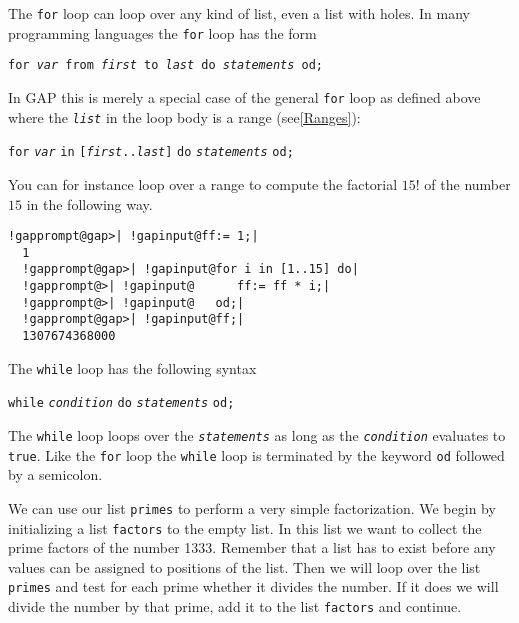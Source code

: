 \documentclass[a4paper,11pt]{report}
\begin{document}
{{ The \texttt{for} loop can loop over any kind of list, even a list with holes. In many
programming languages the \texttt{for} loop has the form 

 \texttt{for \mbox{\texttt{\mdseries\slshape var}} from \mbox{\texttt{\mdseries\slshape first}} to \mbox{\texttt{\mdseries\slshape last}} do \mbox{\texttt{\mdseries\slshape statements}} od;} 

 In \textsf{GAP} this is merely a special case of the general \texttt{for} loop as defined above where the \mbox{\texttt{\mdseries\slshape list}} in the loop body is a range (see{\nobreakspace}\ref{Ranges}): 

 \texttt{for} \mbox{\texttt{\mdseries\slshape var}} \texttt{in} \texttt{[\mbox{\texttt{\mdseries\slshape first}}..\mbox{\texttt{\mdseries\slshape last}}]} \texttt{do} \mbox{\texttt{\mdseries\slshape statements}} \texttt{od}\texttt{;} 

 You can for instance loop over a range to compute the factorial $15!$ of the number $15$ in the following way. 

 
\begin{Verbatim}[commandchars=!@|,fontsize=\small,frame=single,label=Example]
  !gapprompt@gap>| !gapinput@ff:= 1;|
  1
  !gapprompt@gap>| !gapinput@for i in [1..15] do|
  !gapprompt@>| !gapinput@      ff:= ff * i;|
  !gapprompt@>| !gapinput@   od;|
  !gapprompt@gap>| !gapinput@ff;|
  1307674368000
\end{Verbatim}
 

 The \texttt{while} loop has the following syntax 

 \texttt{while} \mbox{\texttt{\mdseries\slshape condition}} \texttt{do} \mbox{\texttt{\mdseries\slshape statements}} \texttt{od}\texttt{;} 

 The \texttt{while} loop loops over the \mbox{\texttt{\mdseries\slshape statements}} as long as the \mbox{\texttt{\mdseries\slshape condition}} evaluates to \texttt{true}. Like the \texttt{for} loop the \texttt{while} loop is terminated by the keyword \texttt{od} followed by a semicolon. 

 We can use our list \texttt{primes} to perform a very simple factorization. We begin by initializing a list \texttt{factors} to the empty list. In this list we want to collect the prime factors of the
number 1333. Remember that a list has to exist before any values can be
assigned to positions of the list. Then we will loop over the list \texttt{primes} and test for each prime whether it divides the number. If it does we will
divide the number by that prime, add it to the list \texttt{factors} and continue. 

}}
\end{document}
